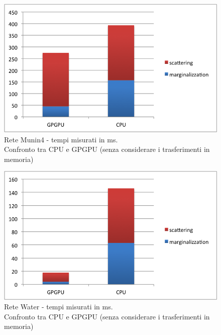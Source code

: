 \documentclass[a4paper]{article}   %
\begin{document}
\begin{figure}[p]
\centering
\includegraphics[scale=0.8]{Munin4.png}
\caption{Rete Munin4 - tempi misurati in ms.\\Confronto tra CPU e GPGPU (senza considerare i trasferimenti in memoria)} 
\label{graficoMunin4}
\end{figure}

\begin{figure}[p]
\centering
\includegraphics[scale=0.8]{Water.png}
\caption{Rete Water - tempi misurati in ms.\\Confronto tra CPU e GPGPU (senza considerare i trasferimenti in memoria)} 
\label{graficoWater}
\end{figure}
\end{document}
